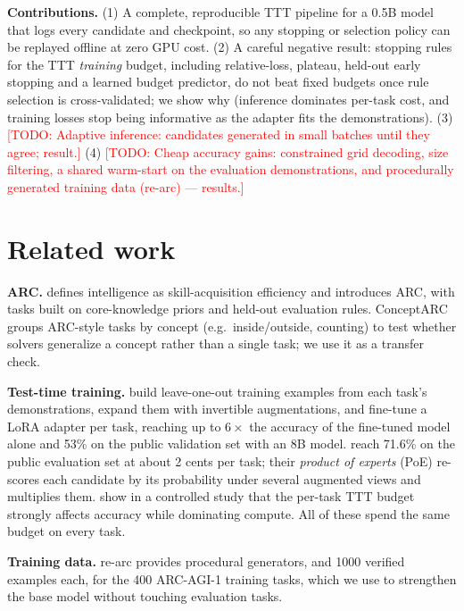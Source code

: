 \documentclass{article}
\newcommand{\todo}[1]{\textcolor{red}{[TODO: #1]}}
\begin{document}
\textbf{Contributions.}
(1) A complete, reproducible TTT pipeline for a 0.5B model that logs every candidate and checkpoint, so any stopping or selection policy can be replayed offline at zero GPU cost.
(2) A careful negative result: stopping rules for the TTT \emph{training} budget, including relative-loss, plateau, held-out early stopping and a learned budget predictor, do not beat fixed budgets once rule selection is cross-validated; we show why (inference dominates per-task cost, and training losses stop being informative as the adapter fits the demonstrations).
(3) \todo{Adaptive inference: candidates generated in small batches until they agree; result.}
(4) \todo{Cheap accuracy gains: constrained grid decoding, size filtering, a shared warm-start on the evaluation demonstrations, and procedurally generated training data (re-arc) --- results.}

\section{Related work}

\textbf{ARC.} \textcite{chollet2019measure} defines intelligence as skill-acquisition efficiency and introduces ARC, with tasks built on core-knowledge priors and held-out evaluation rules. ConceptARC \cite{moskvichev2023conceptarc} groups ARC-style tasks by concept (e.g.\ inside/outside, counting) to test whether solvers generalize a concept rather than a single task; we use it as a transfer check.

\textbf{Test-time training.} \textcite{akyurek2024surprising} build leave-one-out training examples from each task's demonstrations, expand them with invertible augmentations, and fine-tune a LoRA adapter \cite{hu2021lora} per task, reaching up to $6\times$ the accuracy of the fine-tuned model alone and 53\% on the public validation set with an 8B model. \textcite{franzen2025product} reach 71.6\% on the public evaluation set at about 2 cents per task; their \emph{product of experts} (PoE) re-scores each candidate by its probability under several augmented views and multiplies them. \textcite{deliege2026trainingbudgets} show in a controlled study that the per-task TTT budget strongly affects accuracy while dominating compute. All of these spend the same budget on every task.

\textbf{Training data.} re-arc \cite{hodel2024rearc} provides procedural generators, and 1000 verified examples each, for the 400 ARC-AGI-1 training tasks, which we use to strengthen the base model without touching evaluation tasks.
\end{document}
